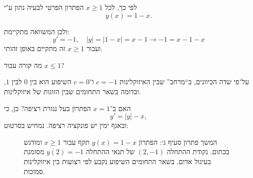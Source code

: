 \documentclass{article}
\numberwithin{equation}{section}
\newcounter{solution}[section]
\begin{document}
לפי כך, לכל $x \geq 1$ הפתרון הפרטי לבעיה נתון ע"י 
\[
\boxed{y(x) = 1 - x}.
\]

ולכן המשוואה מתקיימת: 
\[
y' = -1, \quad |y| = |1 - x| = x - 1\rightarrow -1=x-1-x
\]
ועבור $x \geq 1$ זה מתקיים באופן זהותי.

מה קורה עבור $x \leq 1$?

על־פי שדה הכיוונים, ב“מרחב” שבין האיזוקלינות 
$c=-1$ ו־$c=0$ 
השיפוע הוא בין $0$ לבין $1$, 
ובדומה בשאר התחומים שבין הזוגות של איזוקלינות. 

האם ב־$x=1$ הפתרון בעל נגזרת רציפה?  
כן, כי 
\[
y' = |y| - x,
\]
ובאגף ימין יש פונקציה רציפה.
נמחיש בסרטוט:
\begin{figure}[H]
\centering
{}
\caption{המשך פתרון סעיף ג׳: הפתרון $y(x)=1-x$ תקף עבור $x \geq 1$ ומודגש בכתום.  
נקודת ההתחלה $(2,-1)$ של תנאי ההתחלה $y(2)=-1$ מסומנת בעיגול אדום.  
בשאר התחומים השיפוע נקבע לפי רצועות בין איזוקלינות סמוכות.}
\label{fig:dirfield_abs_continuation}
\end{figure}
\end{document}
